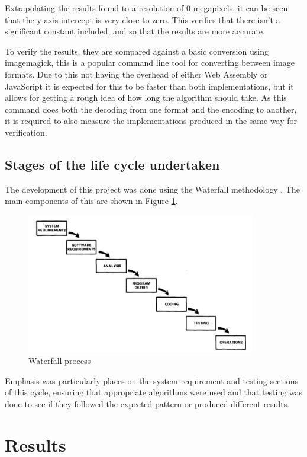 \documentclass[12pt,a4paper]{article}
\begin{document}
Extrapolating the results found to a resolution of 0 megapixels, it can be seen that the y-axis intercept is very close to zero. This verifies that there isn't a significant constant included, and so that the results are more accurate.


To verify the results, they are compared against a basic conversion using imagemagick, this is a popular command line tool for converting between image formats. Due to this not having the overhead of either Web Assembly or JavaScript it is expected for this to be faster than both implementations, but it allows for getting a rough idea of how long the algorithm should take. As this command does both the decoding from one format and the encoding to another, it is required to also measure the implementations produced in the same way for verification.

\subsection{Stages of the life cycle undertaken}

The development of this project was done using the Waterfall methodology \cite{royce1987managing}. The main components of this are shown in Figure \ref{waterfall}.

\begin{figure}[H]
    \centering
    \includegraphics[width=10cm]{waterfall.png}
    \caption{Waterfall process}
    \label{waterfall}
\end{figure}


Emphasis was particularly places on the system requirement and testing sections of this cycle, ensuring that appropriate algorithms were used and that testing was done to see if they followed the expected pattern or produced different results.



\section{Results}
\end{document}
